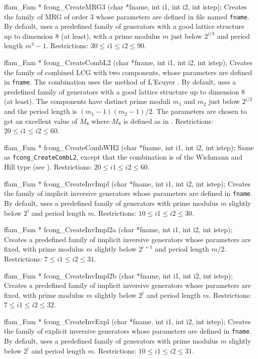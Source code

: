 ffam_Fam * fcong_CreateMRG3 (char *fname, int i1, int i2, int istep);
\endcode
\tab
 Creates the family of MRG of order 3 whose parameters are defined in
 file named {\tt fname}.
 By default, uses a predefined family of generators with
 a good lattice structure up to dimension 8 (at least), with a prime
 modulus $m$ just below $2^{i/3}$ and period length $m^3-1$.
 Restrictions: $ 30 \le i1 \le i2 \le 90$.
\endtab
\code


ffam_Fam * fcong_CreateCombL2 (char *fname, int i1, int i2, int istep);
\endcode
\tab
 Creates the family of combined LCG with two components,  whose
 parameters are defined in {\tt fname}.
 The combination uses the method of L'Ecuyer \cite{rLEC88a}.
 By default, uses a predefined family of generators
 with a good lattice structure up to dimension 8 (at least).
 The components have distinct prime moduli $m_1$ and $m_2$
 just below $2^{i/2}$ and the period length is $(m_1-1)(m_2-1)/2$.
 The parameters are chosen to get an excellent value of $M_8$
 where $M_8$ is defined as in \cite{rLEC99c}.
 Restrictions: $20 \le i1 \le i2 \le 60$.
\endtab
\code


ffam_Fam * fcong_CreateCombWH2 (char *fname, int i1, int i2, int istep);
\endcode
\tab
 Same as {\tt fcong\_CreateCombL2}, except that the combination is of the
 Wichmann and Hill type (see \cite{rLEC91b}).
 Restrictions: $20 \le i1 \le i2 \le 60$.
\endtab
\code


ffam_Fam * fcong_CreateInvImpl (char *fname, int i1, int i2, int istep);
\endcode
\tab
 Creates the family of implicit inversive generators  whose
 parameters are defined in {\tt fname}. By default, uses a
 predefined family of generators with prime modulus $m$
 slightly below $2^i$ and period length $m$.
 Restrictions: $10 \le i1 \le i2 \le 30$.
\endtab
\code


ffam_Fam * fcong_CreateInvImpl2a (char *fname, int i1, int i2, int istep);
\endcode
\tab
 Creates a predefined family of implicit inversive generators whose
 parameters are fixed, with prime modulus $m$
 slightly below $2^{i+1}$ and period length $m/2$.
 Restrictions: $7 \le i1 \le i2 \le 31$.
\endtab
\code


ffam_Fam * fcong_CreateInvImpl2b (char *fname, int i1, int i2, int istep);
\endcode
\tab
 Creates a predefined family of implicit inversive generators whose
 parameters are fixed, with prime modulus $m$
 slightly below $2^i$ and period length $m$.
 Restrictions: $7 \le i1 \le i2 \le 32$.
\endtab
\code


ffam_Fam * fcong_CreateInvExpl (char *fname, int i1, int i2, int istep);
\endcode
\tab
 Creates the family of explicit inversive generators  whose
 parameters are defined in {\tt fname}. By default, uses a
 predefined family of generators with prime modulus $m$
 slightly below $2^i$ and period length $m$.
 Restrictions: $10 \le i1 \le i2 \le 31$.
\endtab
\code


